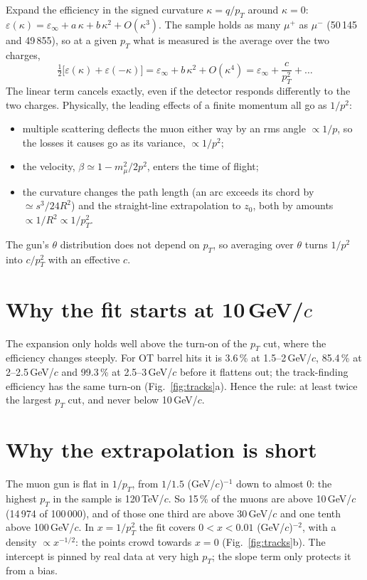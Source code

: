 \documentclass[11pt,letterpaper]{article}
\newcommand{\pT}{p_T}
\newcommand{\einf}{\varepsilon_\infty}
\begin{document}
Expand the efficiency in the signed curvature $\kappa = q/\pT$ around $\kappa = 0$:
$\varepsilon(\kappa) = \einf + a\,\kappa + b\,\kappa^2 + O(\kappa^3)$. The sample holds as many $\mu^+$ as
$\mu^-$ (50\,145 and 49\,855), so at a given $\pT$ what is measured is the
average over the two charges,
\begin{equation}
\tfrac12\bigl[\varepsilon(\kappa) + \varepsilon(-\kappa)\bigr] = \einf + b\,\kappa^2 + O(\kappa^4)
= \einf + \frac{c}{\pT^2} + \dots
\end{equation}
The linear term cancels exactly, even if the detector responds differently to the two charges. Physically, the
leading effects of a finite momentum all go as $1/p^2$:
\begin{itemize}[leftmargin=1.5em]
\item multiple scattering deflects the muon either way by an rms angle $\propto 1/p$, so the losses it causes go
as its variance, $\propto 1/p^2$;
\item the velocity, $\beta \simeq 1 - m_\mu^2/2p^2$, enters the time of flight;
\item the curvature changes the path length (an arc exceeds its chord by $\simeq s^3/24R^2$) and the
straight-line extrapolation to $z_0$, both by amounts $\propto 1/R^2 \propto 1/\pT^2$.
\end{itemize}
The gun's $\theta$ distribution does not depend on $\pT$, so averaging over $\theta$ turns $1/p^2$ into $c/\pT^2$
with an effective $c$.

\section{\texorpdfstring{Why the fit starts at 10\,GeV/$c$}{Why the fit starts at 10 GeV/c}}

The expansion only holds well above the turn-on of the $\pT$ cut, where the efficiency changes steeply. For OT
barrel hits it is 3.6\,\% at 1.5--2\,GeV/$c$, 85.4\,\% at 2--2.5\,GeV/$c$ and
99.3\,\% at 2.5--3\,GeV/$c$ before it flattens out; the track-finding efficiency has the same
turn-on (Fig.~\ref{fig:tracks}a). Hence the rule: at least twice the largest $\pT$ cut, and never below
10\,GeV/$c$.

\section{Why the extrapolation is short}

The muon gun is flat in $1/\pT$, from $1/1.5$ (GeV/$c$)$^{-1}$ down to almost 0: the highest $\pT$ in the sample
is 120\,TeV/$c$. So 15\,\% of the muons are above 10\,GeV/$c$
(14\,974 of 100\,000), and of those one third are above 30\,GeV/$c$ and one tenth above
100\,GeV/$c$. In $x = 1/\pT^2$ the fit covers $0 < x < 0.01$ (GeV/$c$)$^{-2}$, with a density $\propto x^{-1/2}$:
the points crowd towards $x = 0$ (Fig.~\ref{fig:tracks}b). The intercept is pinned by real data at very high
$\pT$; the slope term only protects it from a bias.
\end{document}
